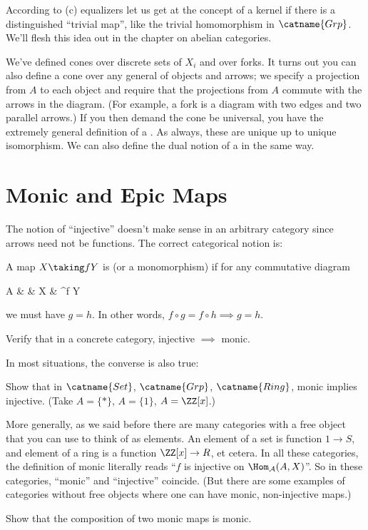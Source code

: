 According to (c) equalizers let us get at the concept of a kernel if there is a distinguished
``trivial map'', like the trivial homomorphism in $\catname{Grp}$.
We'll flesh this idea out in the chapter on abelian categories.

\begin{remark}
	We've defined cones over discrete sets of $X_i$ and over forks.
	It turns out you can also define a cone over any general  of objects and arrows;
	we specify a projection from $A$ to each object and
	require that the projections from $A$ commute with the arrows in the diagram.
	(For example, a fork is a diagram with two edges and two parallel arrows.)
	If you then demand the cone be universal, you have the extremely general definition of a .
	As always, these are unique up to unique isomorphism.
	We can also define the dual notion of a  in the same way.
\end{remark}

\section{Monic and Epic Maps}
The notion of ``injective'' doesn't make sense in an arbitrary category since arrows need not be functions.
The correct categorical notion is:
\begin{definition}
	A map $X \taking f Y$ is  (or a monomorphism) if for any commutative diagram
	\begin{diagram}
		A &  & X & \rTo^f Y 
	\end{diagram}
	we must have $g = h$.
	In other words, $f \circ g = f \circ h \implies g = h$.
\end{definition}
\begin{ques}
	Verify that in a concrete category,
	injective $\implies$ monic.
\end{ques}
In most situations, the converse is also true:
\begin{exercise}
	Show that in $\catname{Set}$, $\catname{Grp}$, $\catname{Ring}$,
	monic implies injective. (Take $A = \{\ast\}$, $A = \{1\}$, $A = \ZZ[x]$.)
\end{exercise}
More generally, as we said before there are many categories
with a free object that you can use to think of as elements.
An element of a set is function $1 \to S$, and element of a ring is a function $\ZZ[x] \to R$, et cetera.
In all these categories, the definition of monic literally reads ``$f$ is injective on $\Hom_\AA(A, X)$''.
So in these categories, ``monic'' and ``injective'' coincide.
(But there are some examples of categories without free objects where one can have monic,
non-injective maps.)
\begin{ques}
	Show that the composition of two monic maps is monic.
\end{ques}

